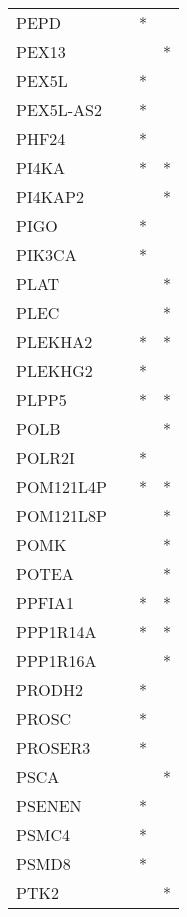 \begin{longtable}{lccc}
PEPD         &           &   * &         \\
PEX13        &           &     &       * \\
PEX5L        &           &   * &         \\
PEX5L-AS2    &           &   * &         \\
PHF24        &           &   * &         \\
PI4KA        &           &   * &       * \\
PI4KAP2      &           &     &       * \\
PIGO         &           &   * &         \\
PIK3CA       &           &   * &         \\
PLAT         &           &     &       * \\
PLEC         &           &     &       * \\
PLEKHA2      &           &   * &       * \\
PLEKHG2      &           &   * &         \\
PLPP5        &           &   * &       * \\
POLB         &           &     &       * \\
POLR2I       &           &   * &         \\
POM121L4P    &           &   * &       * \\
POM121L8P    &           &     &       * \\
POMK         &           &     &       * \\
POTEA        &           &     &       * \\
PPFIA1       &           &   * &       * \\
PPP1R14A     &           &   * &       * \\
PPP1R16A     &           &     &       * \\
PRODH2       &           &   * &         \\
PROSC        &           &   * &         \\
PROSER3      &           &   * &         \\
PSCA         &           &     &       * \\
PSENEN       &           &   * &         \\
PSMC4        &           &   * &         \\
PSMD8        &           &   * &         \\
PTK2         &           &     &       * \\

\end{longtable}
